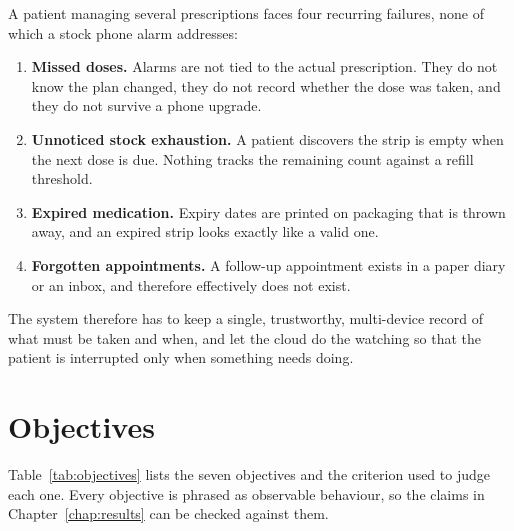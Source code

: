 \documentclass[11pt,a4paper]{report}
\begin{document}
A patient managing several prescriptions faces four recurring failures, none of which a stock phone
alarm addresses:

\begin{enumerate}[label=\textbf{P\arabic*.}]
  \item \textbf{Missed doses.} Alarms are not tied to the actual prescription. They do not know the
        plan changed, they do not record whether the dose was taken, and they do not survive a phone
        upgrade.
  \item \textbf{Unnoticed stock exhaustion.} A patient discovers the strip is empty when the next dose
        is due. Nothing tracks the remaining count against a refill threshold.
  \item \textbf{Expired medication.} Expiry dates are printed on packaging that is thrown away, and an
        expired strip looks exactly like a valid one.
  \item \textbf{Forgotten appointments.} A follow-up appointment exists in a paper diary or an inbox,
        and therefore effectively does not exist.
\end{enumerate}

The system therefore has to keep a single, trustworthy, multi-device record of what must be taken and
when, and let the cloud do the watching so that the patient is interrupted only when something needs
doing.

\section{Objectives}

Table~\ref{tab:objectives} lists the seven objectives and the criterion used to judge each one. Every
objective is phrased as observable behaviour, so the claims in Chapter~\ref{chap:results} can be checked
against them.
\end{document}
